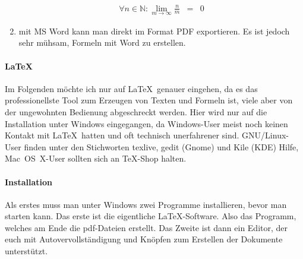 \begin{enumerate}
\begin{eqnarray*}
               \forall n\in\mathbb{N}:\lim
                                  \limits_{m\to \infty}\frac{n}{m} & = & 0
          \end{eqnarray*}
    \item mit MS Word kann man direkt im Format PDF exportieren. Es ist jedoch sehr mühsam, Formeln mit Word zu erstellen.
\end{enumerate}

\paragraph{\LaTeX}
Im Folgenden möchte ich nur auf \LaTeX~genauer eingehen, da es das professionellste Tool zum Erzeugen von Texten und Formeln ist, viele aber von der ungewohnten Bedienung abgeschreckt werden.
Hier wird nur auf die Installation unter Windows eingegangen, da Windows-User meist noch keinen Kontakt mit \LaTeX~hatten und oft technisch unerfahrener sind.
GNU/Linux-User finden unter den Stichworten texlive, gedit (Gnome) und Kile (KDE) Hilfe, Mac~OS~X-User sollten sich an TeX-Shop halten.

\paragraph{Installation}
Als erstes muss man unter Windows zwei Programme installieren, bevor man starten kann.
Das erste ist die eigentliche \LaTeX -Software.
Also das Programm, welches am Ende die pdf-Dateien erstellt.
Das Zweite ist dann ein Editor, der euch mit Autovervollständigung und Knöpfen zum Erstellen der Dokumente unterstützt.


